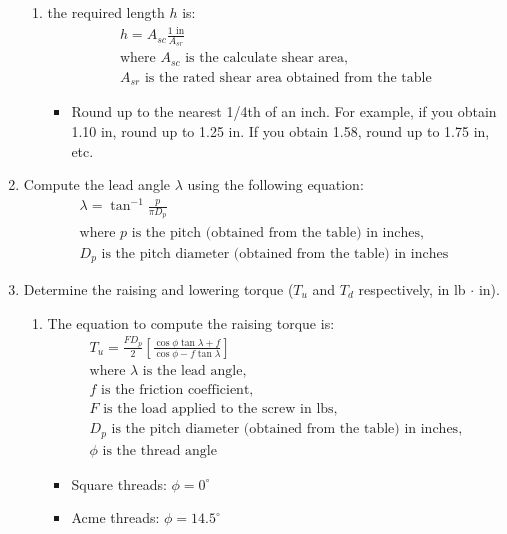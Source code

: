 \documentclass[11pt, fleqn]{article}
\begin{document}
\begin{enumerate}
\begin{enumerate}
        \item the required length $h$ is:
        \begin{align*}
            h = A_{sc}\frac{1\text{ in}}{A_{sr}}\\
            \text{where $A_{sc}$ is the calculate shear area,}\\
            \text{$A_{sr}$ is the rated shear area obtained from the table}
        \end{align*}
        \begin{itemize}
            \item Round up to the nearest 1/4th of an inch. For example, if you obtain 1.10 in, round up to 1.25 in. If you obtain 1.58, round up to 1.75 in, etc.
        \end{itemize}
    \end{enumerate}
    \item Compute the lead angle $\lambda$ using the following equation:
    \begin{align*}
        \lambda = \tan^{-1}{\frac{p}{\pi D_p}}\\
        \text{where $p$ is the pitch (obtained from the table) in inches,}\\
        \text{$D_p$ is the pitch diameter (obtained from the table) in inches}
    \end{align*}
    \item Determine the raising and lowering torque ($T_u$ and $T_d$ respectively, in lb $\cdot$ in).
    \begin{enumerate}
        \item The equation to compute the raising torque is:
        \begin{align*}
            T_u = \frac{FD_p}{2}\left[\frac{\cos{\phi}\tan{\lambda} + f}{\cos{\phi}-f\tan{\lambda}} \right]\\
            \text{where $\lambda$ is the lead angle,}\\
            \text{$f$ is the friction coefficient,}\\
            \text{$F$ is the load applied to the screw in lbs,}\\
            \text{$D_p$ is the pitch diameter (obtained from the table) in inches,}\\
            \text{$\phi$ is the thread angle}
        \end{align*}
        \begin{itemize}
            \item Square threads: $\phi = 0^{\circ}$
            \item Acme threads: $\phi = 14.5^{\circ}$

\end{itemize}
\end{enumerate}
\end{enumerate}
\end{document}
